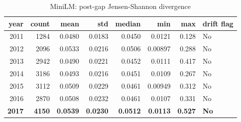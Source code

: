 \begin{table}[ht]
\centering
\caption{MiniLM: post-gap Jensen-Shannon divergence}
\label{tab:minilm_jsd_yearly}
\begin{tabular}{rrrrrrrl}
\toprule
year & count & mean & std & median & min & max & drift flag \\
\midrule
2011 & 1284 & 0.0480 & 0.0183 & 0.0450 & 0.0121 & 0.128 & No \\
2012 & 2096 & 0.0533 & 0.0216 & 0.0506 & 0.00897 & 0.288 & No \\
2013 & 2942 & 0.0490 & 0.0221 & 0.0452 & 0.0111 & 0.417 & No \\
2014 & 3186 & 0.0493 & 0.0216 & 0.0451 & 0.0109 & 0.267 & No \\
2015 & 3112 & 0.0509 & 0.0229 & 0.0461 & 0.00949 & 0.312 & No \\
2016 & 2870 & 0.0508 & 0.0232 & 0.0461 & 0.0107 & 0.331 & No \\
\textbf{2017} & \textbf{4150} & \textbf{0.0539} & \textbf{0.0230} & \textbf{0.0512} & \textbf{0.0113} & \textbf{0.527} & \textbf{No} \\
\bottomrule
\end{tabular}
\end{table}
